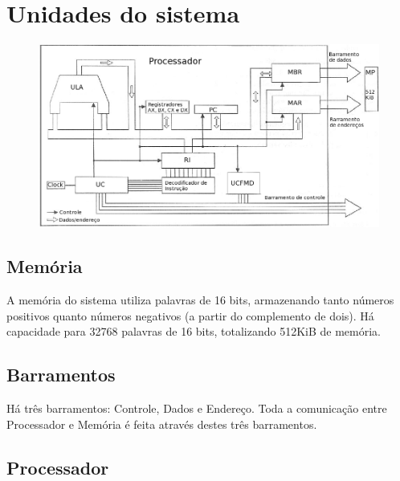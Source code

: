 \documentclass[
	12pt,				%
	oneside,			%
	a4paper,			%
	english,			%
	french,				%
	spanish,			%
	brazil,				%
	]{abntex2}
\begin{document}
{\section{Unidades do sistema}

\begin{figure}[htb]
 \label{fig:diagrama-blocos}
 \centering
 \includegraphics[scale=0.5]{processador.png}
\end{figure}
	\subsection{Memória}
	A memória do sistema utiliza palavras de 16 bits, armazenando tanto números
	positivos quanto números negativos (a partir do complemento de dois). Há
	capacidade para 32768 palavras de 16 bits, totalizando 512KiB de memória.

	\subsection{Barramentos}
	Há três barramentos: Controle, Dados e Endereço. Toda a comunicação entre
	Processador e Memória é feita através destes três barramentos.

	\subsection{Processador}
}
\end{document}
